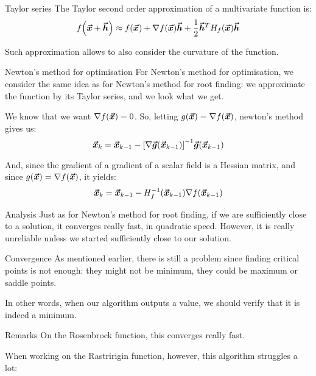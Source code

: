 \documentclass[a4paper]{article}
\begin{document}
\begin{parag}{Taylor series}
    The Taylor second order approximation of a multivariate function is: 
    \[f\left(\bvec{x} + \bvec{h}\right) \approx f\left(\bvec{x}\right) + \nabla f\left(\bvec{x}\right) \bvec{h} + \frac{1}{2} \bvec{h}^T H_f\left(\bvec{x}\right) \bvec{h}\]
    
    Such approximation allows to also consider the curvature of the function. 
\end{parag}

\begin{parag}{Newton's method for optimisation}
    For Newton's method for optimisation, we consider the same idea as for Newton's method for root finding: we approximate the function by its Taylor series, and we look what we get.

    We know that we want $\nabla f\left(\bvec{x}\right) = 0$. So, letting $g\left(\bvec{x}\right) = \nabla f\left(\bvec{x}\right)$, newton's method gives us: 
    \[\bvec{x}_k = \bvec{x}_{k-1} - \left[\nabla \bvec{g}\left(\bvec{x}_{k-1}\right)\right]^{-1} \bvec{g}\left(\bvec{x}_{k-1}\right)\]
    
    And, since the gradient of a gradient of a scalar field is a Hessian matrix, and since $g\left(\bvec{x}\right) = \nabla f\left(\bvec{x}\right)$, it yields:
    \[\bvec{x}_k = \bvec{x}_{k-1} - H^{-1}_f\left(\bvec{x}_{k-1}\right) \nabla f\left(\bvec{x}_{k-1}\right)\]
    
    \begin{subparag}{Analysis}
        Just as for Newton's method for root finding, if we are sufficiently close to a solution, it converges really fast, in quadratic speed. However, it is really unreliable unless we started sufficiently close to our solution.
    \end{subparag}

    \begin{subparag}{Convergence}
        As mentioned earlier, there is still a problem since finding critical points is not enough: they might not be minimum, they could be maximum or saddle points.
            
        In other words, when our algorithm outputs a value, we should verify that it is indeed a minimum.
    \end{subparag}
    

    \begin{subparag}{Remarks}
        On the Rosenbrock function, this converges really fast.

        When working on the Rastririgin function, however, this algorithm struggles a lot:
    \end{subparag}
\end{parag}
\end{document}
